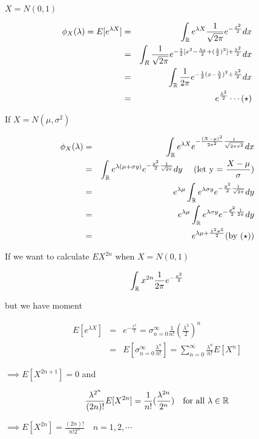 \begin{ex*}
	$X = N(0,1)$
	
	\begin{eqnarray*}
		\phi_X(\lambda) = E[e^{\lambda X}] &=& \int_{\mathbb{R}}e^{\lambda X}\frac{1}{\sqrt{2\pi}}e^{-\frac{x^2}{2}} dx \\
		&=& \int_R \frac{1}{\sqrt{2\pi}}e^{-\frac{1}{2}[x^2 - \frac{\lambda x}{2} + (\frac{\lambda}{2})^2] + \frac{\lambda^2}{2}}dx\\
		&=& \int_{\mathbb{R}}\frac{1}{2\pi}e^{-\frac{1}{2}(x - \frac{\lambda}{2})^2 + \frac{\lambda^2}{2}}dx \\
		&=& e^{\frac{\lambda^2}{2}} \cdots (\star)
	\end{eqnarray*}
	
	If $X = N(\mu,\sigma^2)$
	
	\begin{eqnarray*}
		\phi_X(\lambda) &=& \int_{\mathbb{R}}e^{\lambda X}e^{-\frac{(X - \mu)^2}{2\sigma^2}\frac{1}{\sqrt{2\pi\sigma^2}}}dx \\
		&=& \int_{\mathbb{R}}e^{\lambda(\mu + \sigma y)}e^{-\frac{y^2}{2}\frac{1}{\sqrt{2\pi}}}dy  \quad\text{   (let y = $\frac{X - \mu}{\sigma}$)}\\
		&=& e^{\lambda\mu}\int_{\mathbb{R}}e^{\lambda \sigma y}e^{-\frac{y^2}{2}\frac{1}{\sqrt{2\pi}}}dy \\
		&=& e^{\lambda\mu}\int_{\mathbb{R}}e^{\lambda\sigma y}e^{-\frac{y^2}{2}\frac{1}{2\pi}}dy\\
		&=& e^{\lambda\mu + \frac{\lambda^2\sigma^2}{2}} \text{(by $(\star)$)}
	\end{eqnarray*}
	
	If we want to calculate $EX^{2n}$ when $X = N(0,1)$
	
	$$\int_{\mathbb{R}} x^{2n}\frac{1}{2\pi}e^{-\frac{x^2}{2}}$$
	
	but we have moment
	
	\begin{eqnarray*}
		E[e^{\lambda X}] &=& e^{-\frac{x^2}{2}} = \sigma^{\infty}_{n = 0}\frac{1}{n!}(\frac{\lambda^2}{2})^n \\
		&=& E[\sigma^{\infty}_{n = 0}\frac{\lambda^n}{n!}] = \sum^{\infty}_{n=0}\frac{\lambda^n}{n!}E[X^n]
	\end{eqnarray*}
	
	$\implies E[X^{2n + 1}] = 0$ and
	
	$$\frac{\lambda^{2^n}}{(2n)!} E[X^{2n}] = \frac{1}{n!}(\frac{\lambda^{2n}}{2^n}) \text{\quad for all $\lambda \in \mathbb{R}$}$$
	
	$\implies E[X^{2n}] = \frac{(2n)!}{n!2^n}\quad n = 1,2,\cdots$
\end{ex*}



